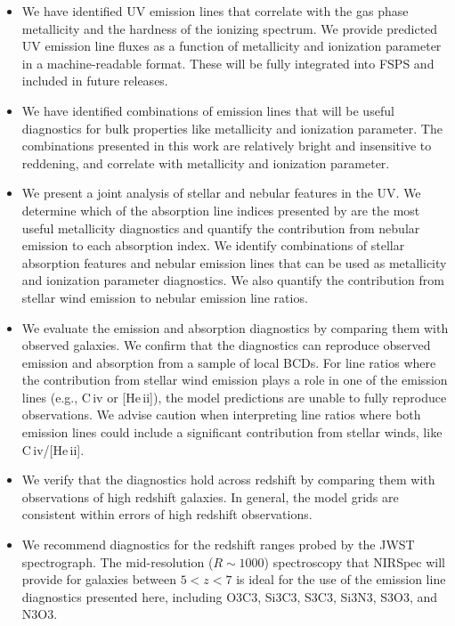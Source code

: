 \documentclass[preprint2,trackchanges]{aastex62}
\newcommand{\FSPS}{{\sc FSPS}\xspace}
\newcommand{\heii}{[He\,{\sc ii}]\xspace}
\newcommand{\civ}{C\,{\sc iv}\xspace}
\begin{document}
\begin{itemize}
    \item We have identified UV emission lines that correlate with the gas phase metallicity and the hardness of the ionizing spectrum. We provide predicted UV emission line fluxes as a function of metallicity and ionization parameter in a machine-readable format. These will be fully integrated into \FSPS and included in future releases.
    \item We have identified combinations of emission lines that will be useful diagnostics for bulk properties like metallicity and ionization parameter. The combinations presented in this work are relatively bright and insensitive to reddening, and correlate with metallicity and ionization parameter.
    \item We present a joint analysis of stellar and nebular features in the UV. We determine which of the absorption line indices presented by \citet{Leitherer+2011} are the most useful metallicity diagnostics and quantify the contribution from nebular emission to each absorption index. We identify combinations of stellar absorption features and nebular emission lines that can be used as metallicity and ionization parameter diagnostics. We also quantify the contribution from stellar wind emission to nebular emission line ratios.
    \item We evaluate the emission and absorption diagnostics by comparing them with observed galaxies. We confirm that the diagnostics can reproduce observed emission and absorption from a sample of local BCDs. For line ratios where the contribution from stellar wind emission plays a role in one of the emission lines (e.g., \civ or \heii), the model predictions are unable to fully reproduce observations. We advise caution when interpreting line ratios where both emission lines could include a significant contribution from stellar winds, like \civ/\heii. 
    \item We verify that the diagnostics hold across redshift by comparing them with observations of high redshift galaxies. In general, the model grids are consistent within errors of high redshift observations.
    \item We recommend diagnostics for the redshift ranges probed by the JWST spectrograph. The mid-resolution ($R\sim1000$) spectroscopy that NIRSpec will provide for galaxies between $5 < z < 7$ is ideal for the use of the emission line diagnostics presented here, including O3C3, Si3C3, S3C3, Si3N3, S3O3, and N3O3. 
\end{itemize}
\end{document}
